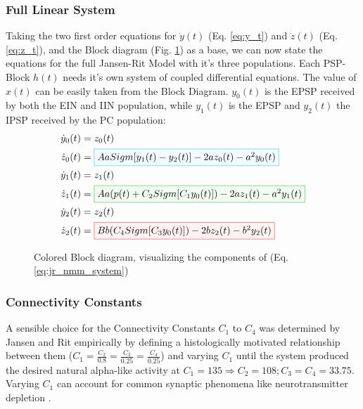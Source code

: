 
\subsubsection{Full Linear System}

Taking the two first order equations for $\dot{y}(t)$ (Eq. \ref{eq:y_t}) and $\dot{z}(t)$ (Eq. \ref{eq:z_t}), and the Block diagram (Fig. \ref{fig:JRBlockColored}) as a base, we can now state the equations for the full Jansen-Rit Model with it's three populations. Each PSP-Block $h(t)$ needs it's own system of coupled differential equations. The value of $x(t)$ can be easily taken from the Block Diagram. $y_0(t)$ is the EPSP received by both the EIN and IIN population, while $y_1(t)$ is the EPSP and $y_2(t)$ the IPSP received by the PC population:
\begin{equation}
    \begin{aligned}
        \dot{y}_0(t) &= z_0(t) \\
        \dot{z}_0(t) &= \fcolorbox{cyan!80}{cyan!5}{$ Aa Sigm[y_1(t) - y_2(t)] - 2az_0(t) - a^2y_0(t) $}\\
        \dot{y}_1(t) &= z_1(t) \\
        \dot{z}_1(t) &= \fcolorbox{green!80}{green!5}{$ Aa(p(t) + C_2Sigm[C_1y_0(t)]) - 2az_1(t) - a^2y_1(t)$}\\
        \dot{y}_2(t) &= z_2(t) \\
        \dot{z}_2(t) &= \fcolorbox{red!80}{red!5}{$ Bb(C_4Sigm[C_3y_0(t)]) - 2bz_2(t) -b^2y_2(t)$} \\
    \end{aligned}\label{eq:jr_nmm_system}
\end{equation}

\begin{figure}[H]
    \centering
    
    \caption{Colored Block diagram, visualizing the components of (Eq. \ref{eq:jr_nmm_system})}
    \label{fig:JRBlockColored}
\end{figure}

\subsubsection{Connectivity Constants}

A sensible choice for the Connectivity Constants $C_1$ to $C_4$ was determined by Jansen and Rit empirically by defining a histologically motivated relationship between them ($C_1 = \frac{C_2}{0.8} = \frac{C_3}{0.25} = \frac{C_4}{0.25}$) and varying $C_1$ until the system produced the desired natural alpha-like activity at $C_1=135 \Rightarrow C_2=108; C_3=C_4=33.75$. Varying $C_1$ can account for common synaptic phenomena like neurotransmitter depletion \parencite{jansen_electroencephalogram_1995}.

